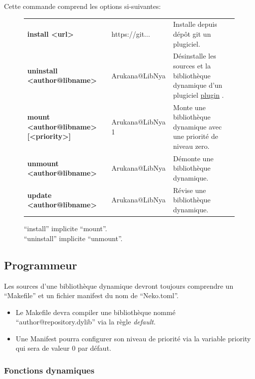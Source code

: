 \documentclass{report}
\begin{document}
Cette commande comprend les options si-suivantes:
\begin{figure}[!ht]
    \begin{minipage}{\textwidth}
    \centering
		\begin{tabular}{p{}p{}p{}}
			\textbf{install <url>} & https://git... & Installe depuis dépôt git un plugiciel. \\
			\textbf{uninstall <author@libname>} & Arukana@LibNya & Désinstalle les sources et la bibliothèque dynamique d'un plugiciel \textendash{} \href{https://fr.wikipedia.org/wiki/Plugin}{plugin} \textendash{}. \\
			\textbf{mount <author@libname> [<priority>]} & Arukana@LibNya 1 & Monte une bibliothèque dynamique avec une priorité de niveau zero. \\
			\textbf{unmount <author@libname>} & Arukana@LibNya & Démonte une bibliothèque dynamique. \\
			\textbf{update <author@libname>} & Arukana@LibNya & Révise une bibliothèque dynamique. \\
		\end{tabular}
    \end{minipage}
    \caption[Caption] {
		\enquote{install} implicite \enquote{mount}. \\
		\enquote{uninstall} implicite \enquote{unmount}.
    }
\end{figure}

\newpage
\subsection{Programmeur}

Les sources d'une bibliothèque dynamique devront toujours comprendre un \enquote{Makefile} et un fichier manifest du nom de \enquote{Neko.toml}. \\

\begin{itemize}
	\item Le Makefile devra compiler une bibliothèque nommé \enquote{author@repository.dylib} via la règle \textit{default}.
	\item Une Manifest pourra configurer son niveau de priorité via la variable priority qui sera de valeur 0 par défaut.
\end{itemize}

\subsubsection{Fonctions dynamiques \textendash{}}
\end{document}
